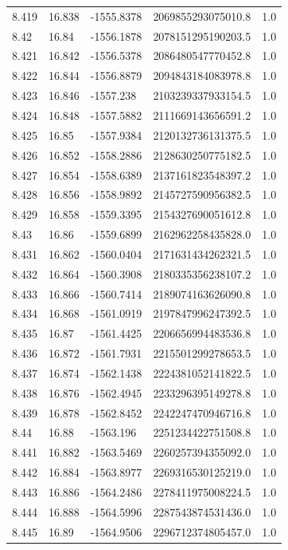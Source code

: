\begin{tabular}{lllll}
8.419 & 16.838 & -1555.8378 & 2069855293075010.8 & 1.0 \\
8.42 & 16.84 & -1556.1878 & 2078151295190203.5 & 1.0 \\
8.421 & 16.842 & -1556.5378 & 2086480547770452.8 & 1.0 \\
8.422 & 16.844 & -1556.8879 & 2094843184083978.8 & 1.0 \\
8.423 & 16.846 & -1557.238 & 2103239337933154.5 & 1.0 \\
8.424 & 16.848 & -1557.5882 & 2111669143656591.2 & 1.0 \\
8.425 & 16.85 & -1557.9384 & 2120132736131375.5 & 1.0 \\
8.426 & 16.852 & -1558.2886 & 2128630250775182.5 & 1.0 \\
8.427 & 16.854 & -1558.6389 & 2137161823548397.2 & 1.0 \\
8.428 & 16.856 & -1558.9892 & 2145727590956382.5 & 1.0 \\
8.429 & 16.858 & -1559.3395 & 2154327690051612.8 & 1.0 \\
8.43 & 16.86 & -1559.6899 & 2162962258435828.0 & 1.0 \\
8.431 & 16.862 & -1560.0404 & 2171631434262321.5 & 1.0 \\
8.432 & 16.864 & -1560.3908 & 2180335356238107.2 & 1.0 \\
8.433 & 16.866 & -1560.7414 & 2189074163626090.8 & 1.0 \\
8.434 & 16.868 & -1561.0919 & 2197847996247392.5 & 1.0 \\
8.435 & 16.87 & -1561.4425 & 2206656994483536.8 & 1.0 \\
8.436 & 16.872 & -1561.7931 & 2215501299278653.5 & 1.0 \\
8.437 & 16.874 & -1562.1438 & 2224381052141822.5 & 1.0 \\
8.438 & 16.876 & -1562.4945 & 2233296395149278.8 & 1.0 \\
8.439 & 16.878 & -1562.8452 & 2242247470946716.8 & 1.0 \\
8.44 & 16.88 & -1563.196 & 2251234422751508.8 & 1.0 \\
8.441 & 16.882 & -1563.5469 & 2260257394355092.0 & 1.0 \\
8.442 & 16.884 & -1563.8977 & 2269316530125219.0 & 1.0 \\
8.443 & 16.886 & -1564.2486 & 2278411975008224.5 & 1.0 \\
8.444 & 16.888 & -1564.5996 & 2287543874531436.0 & 1.0 \\
8.445 & 16.89 & -1564.9506 & 2296712374805457.0 & 1.0 \\

\end{tabular}
